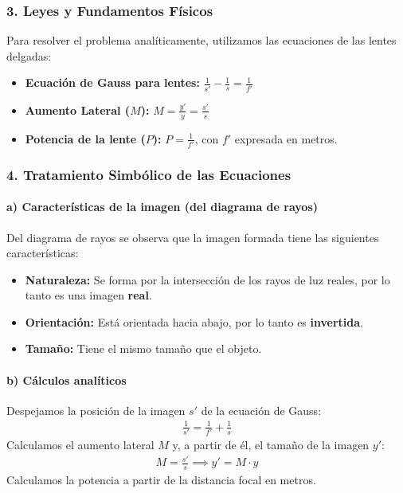 \subsubsection*{3. Leyes y Fundamentos Físicos}
Para resolver el problema analíticamente, utilizamos las ecuaciones de las lentes delgadas:
\begin{itemize}
    \item \textbf{Ecuación de Gauss para lentes:} $\frac{1}{s'} - \frac{1}{s} = \frac{1}{f'}$
    \item \textbf{Aumento Lateral ($M$):} $M = \frac{y'}{y} = \frac{s'}{s}$
    \item \textbf{Potencia de la lente ($P$):} $P = \frac{1}{f'}$, con $f'$ expresada en metros.
\end{itemize}

\subsubsection*{4. Tratamiento Simbólico de las Ecuaciones}
\paragraph{a) Características de la imagen (del diagrama de rayos)}
Del diagrama de rayos se observa que la imagen formada tiene las siguientes características:
\begin{itemize}
    \item \textbf{Naturaleza:} Se forma por la intersección de los rayos de luz reales, por lo tanto es una imagen \textbf{real}.
    \item \textbf{Orientación:} Está orientada hacia abajo, por lo tanto es \textbf{invertida}.
    \item \textbf{Tamaño:} Tiene el mismo tamaño que el objeto.
\end{itemize}

\paragraph{b) Cálculos analíticos}
Despejamos la posición de la imagen $s'$ de la ecuación de Gauss:
\begin{gather}
    \frac{1}{s'} = \frac{1}{f'} + \frac{1}{s}
\end{gather}
Calculamos el aumento lateral $M$ y, a partir de él, el tamaño de la imagen $y'$:
\begin{gather}
    M = \frac{s'}{s} \implies y' = M \cdot y
\end{gather}
Calculamos la potencia a partir de la distancia focal en metros.

